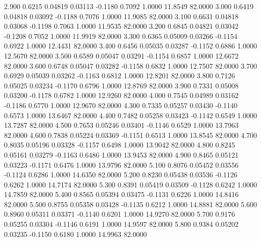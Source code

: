   2.900   0.6215   0.04819   0.03113  -0.1180   0.7092   1.0000  11.8549  82.0000
   3.000   0.6419   0.04818   0.03092  -0.1188   0.7076   1.0000  11.9085  82.0000
   3.100   0.6631   0.04818   0.03068  -0.1198   0.7063   1.0000  11.9535  82.0000
   3.200   0.6845   0.04821   0.03042  -0.1208   0.7052   1.0000  11.9919  82.0000
   3.300   0.6365   0.05009   0.03266  -0.1154   0.6922   1.0000  12.4431  82.0000
   3.400   0.6456   0.05035   0.03287  -0.1152   0.6886   1.0000  12.5670  82.0000
   3.500   0.6589   0.05047   0.03291  -0.1154   0.6857   1.0000  12.6672  82.0000
   3.600   0.6748   0.05047   0.03282  -0.1158   0.6832   1.0000  12.7507  82.0000
   3.700   0.6929   0.05039   0.03262  -0.1163   0.6812   1.0000  12.8201  82.0000
   3.800   0.7126   0.05025   0.03234  -0.1170   0.6796   1.0000  12.8769  82.0000
   3.900   0.7331   0.05008   0.03200  -0.1178   0.6782   1.0000  12.9260  82.0000
   4.000   0.7545   0.04989   0.03162  -0.1186   0.6770   1.0000  12.9670  82.0000
   4.300   0.7335   0.05257   0.03430  -0.1140   0.6573   1.0000  13.6467  82.0000
   4.400   0.7482   0.05258   0.03423  -0.1142   0.6549   1.0000  13.7287  82.0000
   4.500   0.7653   0.05246   0.03401  -0.1146   0.6529   1.0000  13.7963  82.0000
   4.600   0.7838   0.05224   0.03369  -0.1151   0.6513   1.0000  13.8545  82.0000
   4.700   0.8035   0.05196   0.03328  -0.1157   0.6498   1.0000  13.9042  82.0000
   4.800   0.8245   0.05161   0.03279  -0.1163   0.6486   1.0000  13.9453  82.0000
   4.900   0.8465   0.05121   0.03223  -0.1171   0.6476   1.0000  13.9796  82.0000
   5.100   0.8076   0.05452   0.03556  -0.1124   0.6286   1.0000  14.6350  82.0000
   5.200   0.8230   0.05438   0.03536  -0.1126   0.6262   1.0000  14.7174  82.0000
   5.300   0.8391   0.05419   0.03509  -0.1128   0.6242   1.0000  14.7859  82.0000
   5.400   0.8565   0.05394   0.03475  -0.1131   0.6226   1.0000  14.8416  82.0000
   5.500   0.8755   0.05358   0.03428  -0.1135   0.6212   1.0000  14.8881  82.0000
   5.600   0.8960   0.05311   0.03371  -0.1140   0.6201   1.0000  14.9270  82.0000
   5.700   0.9176   0.05255   0.03304  -0.1146   0.6191   1.0000  14.9597  82.0000
   5.800   0.9384   0.05202   0.03235  -0.1150   0.6180   1.0000  14.9963  82.0000
